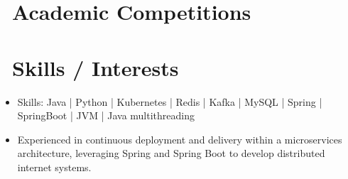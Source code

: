 \documentclass{resume}
\begin{document}
\section{\faTrophy\ Academic Competitions}

\section{\faCogs\ Skills / Interests}
\begin{itemize}[parsep=0.5ex]
  \item Skills: Java | Python | Kubernetes | Redis | Kafka | MySQL | Spring | SpringBoot | JVM | Java multithreading 
  \item Experienced in continuous deployment and delivery within a microservices architecture, leveraging Spring and Spring Boot to develop distributed internet systems.
\end{itemize}
\end{document}
